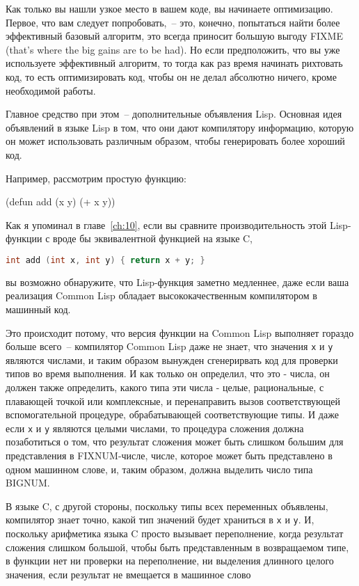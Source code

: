 Как только вы нашли узкое место в вашем коде, вы начинаете оптимизацию. Первое, что вам
следует попробовать,~-- это, конечно, попытаться найти более эффективный базовый
алгоритм, это всегда приносит большую выгоду FIXME (that's where the big gains are to be
had). Но если предположить, что вы уже используете эффективный алгоритм, то тогда как раз
время начинать рихтовать код, то есть оптимизировать код, чтобы он не делал абсолютно
ничего, кроме необходимой работы.

Главное средство при этом~-- дополнительные объявления Lisp. Основная идея объявлений в
языке Lisp в том, что они дают компилятору информацию, которую он может использовать
различным образом, чтобы генерировать более хороший код.

Например, рассмотрим простую функцию:

\begin{myverb}
(defun add (x y) (+ x y))
\end{myverb}

Как я упоминал в главе~\ref{ch:10}, если вы сравните производительность этой Lisp-функции
с вроде бы эквивалентной функцией на языке C,

\begin{lstlisting}[language=C]
int add (int x, int y) { return x + y; }
\end{lstlisting}

вы возможно обнаружите, что Lisp-функция заметно медленнее, даже если ваша реализация
Common Lisp обладает высококачественным компилятором в машинный код.

Это происходит потому, что версия функции на Common Lisp выполняет гораздо больше
всего~-- компилятор Common Lisp даже не знает, что значения \lstinline{x} и \lstinline{y} являются
числами, и таким образом вынужден сгенерирвать код для проверки типов во время выполнения.
И как только он определил, что это - числа, он должен также определить, какого типа эти
числа - целые, рациональные, с плавающей точкой или комплексные, и перенаправить вызов
соответствующей вспомогательной процедуре, обрабатывающей соответствующие типы. И даже
если \lstinline{x} и \lstinline{y} являются целыми числами, то процедура сложения должна
позаботиться о том, что результат сложения может быть слишком большим для представления в
FIXNUM-числе, числе, которое может быть представлено в одном машинном слове, и, таким
образом, должна выделить число типа BIGNUM.

В языке C, с другой стороны, поскольку типы всех переменных объявлены, компилятор знает
точно, какой тип значений будет храниться в \lstinline{x} и \lstinline{y}. И, поскольку арифметика
языка C просто вызывает переполнение, когда результат сложения слишком большой, чтобы быть
представленным в возвращаемом типе, в функции нет ни проверки на переполнение, ни
выделения длинного целого значения, если результат не вмещается в машинное слово


